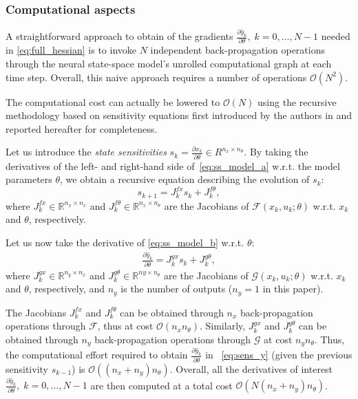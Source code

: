 \documentclass{article}
\newcommand{\R}{\mathbb{R}}
\newcommand{\ny}{{n_y}}
\newcommand{\nx}{{n_x}}
\newcommand{\nsamp}{N}
\newcommand{\npar}{{n_\theta}}
\newcommand{\F}{\mathcal{F}} %
\newcommand{\G}{\mathcal{G}} %
\newcommand{\mean}[1]{\hat{#1}}
\begin{document}
\subsubsection{Computational aspects}A straightforward approach to obtain of the gradients $\frac{\partial \mean{y}_k}{\partial \theta},\; k\!=\!0,\dots,\nsamp\!-\!1$ 
needed in \eqref{eq:full_hessian} is to invoke $\nsamp$ independent back-propagation operations through the neural state-space model's unrolled computational graph at each time step. Overall, this naive approach requires a number of operations $\mathcal{O}(N^2)$. 

The computational cost can actually be lowered to $\mathcal{O}(N)$ using the recursive methodology based on sensitivity equations first introduced by the authors in \cite{forgione2022adaptation} and reported hereafter for completeness.

Let us introduce the \emph{state sensitivities} $s_{k} = \frac{\partial x_{k}}{\partial \theta}\in R^{\nx \times \npar}$.
By taking the derivatives of the left- and right-hand side of~\eqref{eq:ss_model_a} w.r.t. the model parameters $\theta$, we obtain a recursive equation describing the evolution of $s_k$:
\label{eq:sens}
\begin{equation}
    \label{eq:sens_x}
    s_{k+1} = J^{fx}_k s_k + J^{f\theta}_k,
\end{equation}
where $J^{fx}_k \in \R^{\nx \times \nx}$ and $J^{f\theta}_k \in \R^{\nx \times \npar}$ are the Jacobians of  $\mathcal{F}(x_k, u_k; \theta)$ w.r.t. $x_k$ and $\theta$, respectively.

Let us now take the derivative of \eqref{eq:ss_model_b} w.r.t. $\theta$:
\begin{align}
\label{eq:sens_y}
    \frac{\partial \mean{y}_k}{\partial \theta} = J^{gx}_{k} s_k + J^{g\theta}_{k},
\end{align}
where $J^{gx}_{k} \in \R^{\ny \times \nx}$ and $J^{g\theta}_{k} \in \R^{ny \times \npar}$ are the Jacobians of  $\mathcal{G}(x_{k}, u_{k}; \theta)$ w.r.t. $x_{k}$ and $\theta$, respectively,  and $n_y$ is the number of 
outputs ($n_y=1$ in this paper).

The Jacobians $J^{fx}_{k}$ and $J^{f\theta}_{k}$ can be obtained through $\nx$ back-propagation operations through $\F$, thus at cost $\mathcal{O}(\nx \npar)$. Similarly, $J^{gx}_{k}$ and $J^{g\theta}_{k}$ can be obtained through $n_y$ back-propagation operations through $\G$ at cost $\ny \npar$.
Thus, the computational effort required to obtain $\frac{\partial \mean{y}_k}{\partial \theta}$ in ~\eqref{eq:sens_y} (given the previous sensitivity $s_{k-1}$) is $\mathcal{O}((\nx + n_y)\npar)$. Overall, all the derivatives of interest $\frac{\partial \mean{y}_k}{\partial \theta},\; k\!=\!0,\dots,\nsamp\!-\!1$ are then computed at a total cost $\mathcal{O}(\nsamp (\nx + n_y)\npar)$.\\
\end{document}
